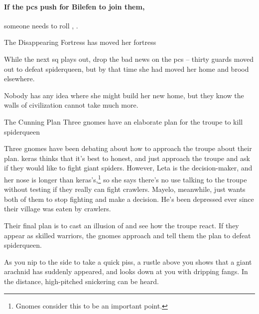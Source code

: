 \paragraph{If the \glspl{pc} push for Bilefen to join them,}
someone needs to roll , \tn[11].


{\squash The Disappearing Fortress}%
{ has moved her fortress}%

While the next \gls{sq} plays out, drop the bad news on the \glspl{pc} -- thirty \glspl{guard} moved out to defeat \gls{spiderqueen}, but by that time she had moved her home and brood elsewhere.

Nobody has any idea where she might build her new home, but they know the walls of civilization cannot take much more.

{The Cunning Plan}%
{Three gnomes have an elaborate plan for the troupe to kill \gls{spiderqueen}}%

\begin{exampletext}
  Three gnomes have been debating about how to approach the troupe about their plan.
  \Gls{keras} thinks that it's best to honest, and just approach the troupe and ask if they would like to fight giant spiders.
  However, Leta is the decision-maker, and her nose is longer than \gls{keras}'s,\footnote{Gnomes consider this to be an important point.} so she says there's no use talking to the troupe without testing if they really can fight \glspl{crawler}.
  Mayelo, meanwhile, just wants both of them to stop fighting and make a decision.
  He's been depressed ever since their \gls{village} was eaten by \glspl{crawler}.

  Their final plan is to cast an illusion of  and see how the troupe react.
  If they appear as skilled warriors, the gnomes approach and tell them the plan to defeat \gls{spiderqueen}.
\end{exampletext}

\begin{boxtext}
  As you nip to the side to take a quick piss, a rustle above you shows that a giant arachnid has suddenly appeared, and looks down at you with dripping fangs.
  In the distance, high-pitched snickering can be heard.
\end{boxtext}


